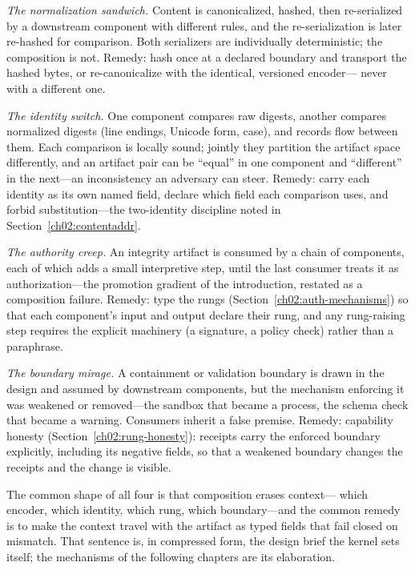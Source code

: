 \emph{The normalization sandwich.} Content is canonicalized, hashed,
then re-serialized by a downstream component with different rules,
and the re-serialization is later re-hashed for comparison. Both
serializers are individually deterministic; the composition is not.
Remedy: hash once at a declared boundary and transport the hashed
bytes, or re-canonicalize with the identical, versioned encoder---
never with a different one.

\emph{The identity switch.} One component compares raw digests,
another compares normalized digests (line endings, Unicode form,
case), and records flow between them. Each comparison is locally
sound; jointly they partition the artifact space differently, and
an artifact pair can be ``equal'' in one component and ``different''
in the next---an inconsistency an adversary can steer. Remedy: carry
each identity as its own named field, declare which field each
comparison uses, and forbid substitution---the two-identity
discipline noted in Section~\ref{ch02:contentaddr}.

\emph{The authority creep.} An integrity artifact is consumed by a
chain of components, each of which adds a small interpretive step,
until the last consumer treats it as authorization---the promotion
gradient of the introduction, restated as a composition failure.
Remedy: type the rungs (Section~\ref{ch02:auth-mechanisms}) so that
each component's input and output declare their rung, and any
rung-raising step requires the explicit machinery (a signature, a
policy check) rather than a paraphrase.

\emph{The boundary mirage.} A containment or validation boundary is
drawn in the design and assumed by downstream components, but the
mechanism enforcing it was weakened or removed---the sandbox that
became a process, the schema check that became a warning. Consumers
inherit a false premise. Remedy: capability honesty
(Section~\ref{ch02:rung-honesty}): receipts carry the enforced
boundary explicitly, including its negative fields, so that a
weakened boundary changes the receipts and the change is visible.

The common shape of all four is that composition erases context---
which encoder, which identity, which rung, which boundary---and the
common remedy is to make the context travel with the artifact as
typed fields that fail closed on mismatch. That sentence is, in
compressed form, the design brief the kernel sets itself; the
mechanisms of the following chapters are its elaboration.

